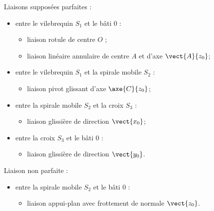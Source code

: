 \begin{multicols}{2}
\begin{multicols}{2}
Liaisons supposées parfaites :
\begin{itemize} 
\item entre le vilebrequin $S_1$ et le bâti 0 :
\begin{itemize}
\item liaison rotule de centre $O$ ;
\item liaison linéaire annulaire de centre $A$ et d’axe $\vect{A}{z_0}$;
\end{itemize}
\item entre le vilebrequin $S_1$ et la spirale mobile $S_2$  :
\begin{itemize}
\item liaison pivot glissant d’axe $\axe{C}{z_0}$;
\end{itemize}
\item entre la spirale mobile $S_2$  et la croix $S_3$  :
\begin{itemize}
\item liaison glissière de direction $\vect{x_0}$;
\end{itemize}
\item entre la croix $S_3$ et le bâti 0 :
\begin{itemize}
\item liaison glissière de direction $\vect{y_0}$.
\end{itemize}
\end{itemize}

Liaison non parfaite :
\begin{itemize}
\item entre la spirale mobile  $S_2$ et le bâti 0 :
\begin{itemize}
\item liaison appui-plan avec frottement de normale $\vect{z_0}$.
\end{itemize}
\end{itemize}






\end{multicols}
\end{multicols}
